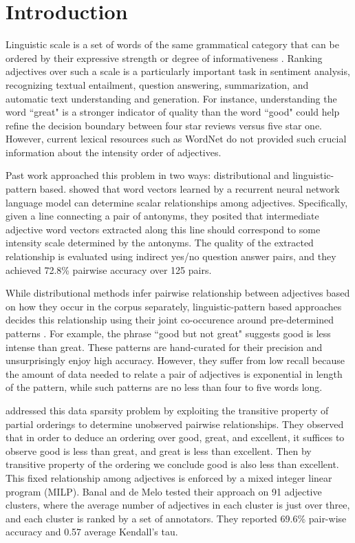  \section{Introduction}

Linguistic scale is a set of words of the same grammatical category that can be ordered by their expressive strength or degree of informativeness \cite{sheinman2009adjscales}. Ranking adjectives over such a scale is a particularly important task in sentiment analysis, recognizing textual entailment, question answering, summarization, and automatic text understanding and generation. For instance, understanding the word ``great" is a stronger indicator of quality than the word ``good" could help refine the decision boundary between four star reviews versus five star one. However, current lexical resources such as WordNet do not provided such crucial information about the intensity order of adjectives.

Past work approached this problem in two ways: distributional and linguistic-pattern based.  showed that word vectors learned by a recurrent neural network language model can determine scalar relationships among adjectives. Specifically, given a line connecting a pair of antonyms, they posited that intermediate adjective word vectors extracted along this line should correspond to some intensity scale determined by the antonyms. The quality of the extracted relationship is evaluated using indirect yes/no question answer pairs, and they achieved 72.8\% pairwise accuracy over 125 pairs.

While distributional methods infer pairwise relationship between adjectives based on how they occur in the corpus separately, linguistic-pattern based approaches decides this relationship using their joint co-occurence around pre-determined patterns \cite{sheinman2009adjscales,schulam2010automatically,sheinman2012refining} . For example, the phrase ``good but not great" suggests good is less intense than great. These patterns are hand-curated for their precision and unsurprisingly enjoy high accuracy. However, they suffer from low recall because the amount of data needed to relate a pair of adjectives is exponential in length of the pattern, while such patterns are no less than four to five words long.

 addressed this data sparsity problem by exploiting the transitive property of partial orderings to determine unobserved pairwise relationships. They observed that in order to deduce an ordering over good, great, and excellent, it suffices to observe good is less than great, and great is less than excellent. Then by transitive property of the ordering we conclude good is also less than excellent. This fixed relationship among adjectives is enforced by a mixed integer linear program (MILP). Banal and de Melo tested their approach on 91 adjective clusters, where the average number of adjectives in each cluster is just over three, and each cluster is ranked by a set of annotators. They reported 69.6\% pair-wise accuracy and 0.57 average Kendall's tau. 


